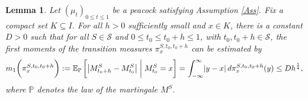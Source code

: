 \documentclass[11pt,a4paper]{article}%
\def\E{{\mathbb E}}
\def\P{{\mathbb P}}
\renewcommand{\subset}{\subseteq}
\newtheorem{lemma}[theorem]{Lemma}
\numberwithin{equation}{section}
\begin{document}
\begin{lemma}\label{sublemma}
	Let $(\mu_t)_{0 \le t \le 1}$ be a peacock satisfying Assumption \ref{Ass}.
	Fix a compact set $K \subset I$.
	For all $h > 0$ sufficiently small and $x \in K$, there is a constant $D > 0$ such that for all $S \in \mathcal S$ and $0 \leq t_0 \leq t_0 + h \leq 1$, with $t_0, t_0 + h \in \mathcal S$, the first moments of the transition measures $\pi_x^{S ,t_0 ,t_0 +h}$ can be estimated by
	\begin{equation} \label{m1}
		m_1\biggl(\pi_x^{S ,t_0 ,t_0 +h}\biggr) := \E_\P\left[\left|M^S_{t_0 +h} - M^S_{t_0}\right|  \biggm| M^S_{t_0}=x\right] 
		=\int_{-\infty}^\infty \lvert y-x\rvert \, d\pi_x^{S ,t_0 ,t_0 +h}(y)
		\le D h^{\frac{1}{4}},
	\end{equation}
	where $\P$ denotes the law of the martingale $M^S$.
\end{lemma}
\end{document}
